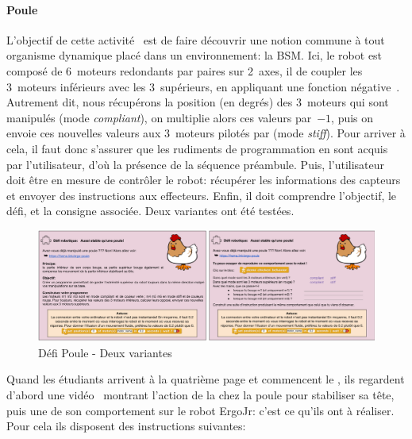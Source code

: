             \paragraph{Poule}\label{sec:act_poule}
                L'objectif de cette activité~ est de faire découvrir une notion commune à tout organisme dynamique placé dans un environnement: la \glsdesc{BSM}.
                Ici, le robot est composé de 6~moteurs redondants par paires sur 2~axes, il   de coupler les 3~moteurs inférieurs avec les 3~supérieurs, en appliquant une fonction négative~. Autrement dit, nous récupérons la position (en degrés) des 3~moteurs qui sont manipulés (mode \textit{compliant}), on multiplie alors ces valeurs par~$-1$, puis on envoie ces nouvelles valeurs aux 3~moteurs pilotés par  (mode \textit{stiff}). Pour arriver à cela, il faut donc s'assurer que les rudiments de programmation en  sont acquis par l'utilisateur, d'où la présence de la séquence préambule. Puis, l'utilisateur doit être en mesure de contrôler le robot: récupérer les informations des capteurs et envoyer des instructions aux effecteurs. Enfin, il doit comprendre l'objectif, le défi, et la consigne associée. Deux variantes ont été testées. 
                \begin{figure}[!h]
                    \centering
                    \includegraphics[width=\linewidth]{Figures/Desprez-act_poule.png}
                    \caption{Défi Poule - Deux variantes}\label{fig:act_poule}
                \end{figure}\par%
                Quand les étudiants arrivent à la quatrième page et commencent le  , ils regardent d'abord une vidéo~ montrant l'action de la  chez la poule pour stabiliser sa tête, puis une   de son comportement sur le robot ErgoJr: c'est ce qu'ils ont à réaliser. Pour cela ils disposent des instructions suivantes:

